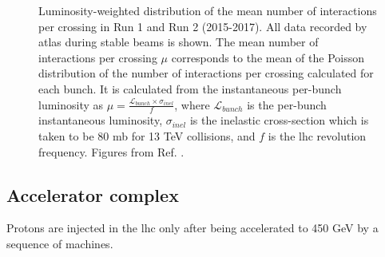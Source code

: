 \begin{figure}[ht]
\centering
{}
\caption{Luminosity-weighted distribution of the mean number of interactions per crossing in 
 Run 1 and  Run 2 (2015-2017). All data recorded by \gls{atlas} during stable beams is shown. The mean number of interactions per crossing $\mu$ corresponds to the mean of the Poisson distribution of the number of interactions per crossing calculated for each bunch. It is calculated from the instantaneous per-bunch luminosity as 
$\mu = \frac{\mathcal{L}_{bunch}\times \sigma_{inel}}{f}$, where $\mathcal{L}_{bunch}$ is the per-bunch instantaneous luminosity, $\sigma_{inel}$ is the inelastic cross-section which is taken to be 80 mb for 13 TeV collisions, and $f$ is the \gls{lhc} revolution frequency. Figures from Ref. \cite{LumiTwiki}.}
\label{fig:atlas:pu}
\end{figure}


\subsection{Accelerator complex}

Protons are injected in the \gls{lhc} only after being accelerated to 450 GeV by a sequence of machines.

